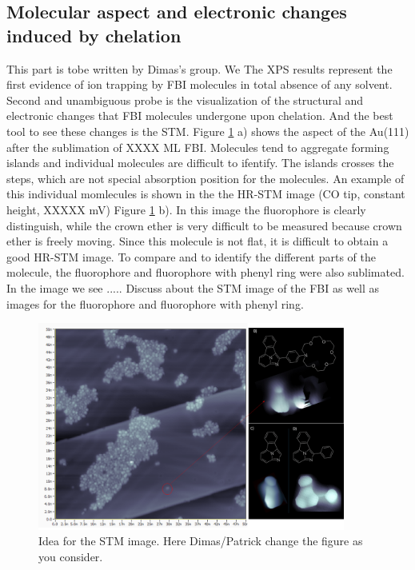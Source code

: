 \documentclass[aps,prl,reprint,longbibliography,superscriptaddress]{revtex4-1}
\newcommand{\completar}[1]{{\color{red} #1}}
\begin{document}
 

\subsection{Molecular aspect and electronic changes induced by chelation}

\completar{This part is tobe written by Dimas's group. We } The XPS results represent the first evidence of ion trapping by FBI molecules in total absence of any solvent. Second and unambiguous probe is the visualization of the structural and electronic changes that FBI molecules undergone upon chelation. And the best tool to see these changes is the STM. Figure \ref{STM_FBI_fluorophore} a) shows the aspect of the Au(111) after the sublimation of XXXX ML FBI. Molecules tend to aggregate forming islands and individual molecules are difficult to ifentify. The islands crosses the steps, which are not special absorption position for the molecules. An example of this individual momlecules is shown in the the HR-STM image (CO tip, constant height, XXXXX mV) Figure \ref{STM_FBI_fluorophore} b). In this image the fluorophore is clearly distinguish, while the crown ether is very difficult to be measured because crown ether is freely moving. 
Since this molecule is not flat, it is difficult to obtain a good HR-STM image. To compare and to identify the different parts of the molecule, the fluorophore and fluorophore with phenyl ring were also sublimated. In the image we see ..... \completar{Discuss about the STM image of the FBI as well as images for the fluorophore and fluorophore with phenyl ring.}

\begin{figure}[ht!]
	\includegraphics[width=0.9\textwidth]{figures/STM_FBI_fluoroforos.png}
	\caption{\label{STM_FBI_fluorophore} 
    Idea for the STM image. Here Dimas/Patrick change the figure as you consider. }
\end{figure}  
\end{document}
